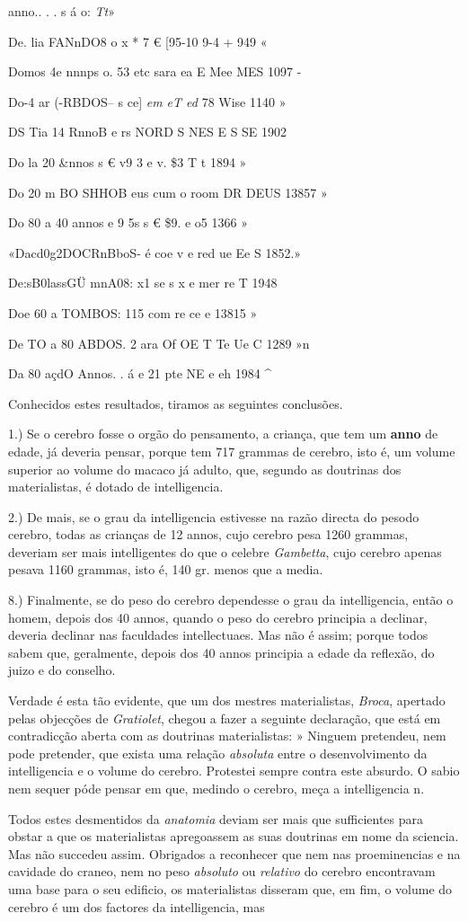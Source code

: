 anno.. . . s á o: \emph{Tt}»\par De. lia FANnDO8 o x * 7 € [95-10 9-4 + 949 «\par Domos 4e nnnps o. 53 etc sara ea E Mee MES 1097 -\par Do-4 ar (-RBDOS-- s ce] \emph{em eT ed} 78 Wise 1140 »\par DS Tia 14 RnnoB e rs NORD S NES E S SE 1902\par Do la 20 \&nnos s € v9 3 e v. \$3 T t 1894 »\par Do 20 m BO SHHOB eus cum o room DR DEUS 13857 »\par Do 80 a 40 annos e 9 5s s € \$9. e o5 1366 »\par «Dacd0g2DOCRnBboS- é coe v e red ue Ee S 1852.»\par De:sB0lassGÜ mnA08: x1 se s x e mer re T 1948\par Doe 60 a TOMBOS: 115 com re ce e 13815 »\par De TO a 80 ABDOS. 2 ara Of OE T Te Ue C 1289 »n\par Da 80 açdO Annos. . á e 21 pte NE e eh 1984 \textasciicircum{}\par Conhecidos estes resultados, tiramos as seguintes conclusões.\par 1.) Se o cerebro fosse o orgão do pensamento, a criança, que tem um \textbf{anno} de edade, já deveria pensar, porque tem 717 grammas de cerebro, isto é, um volume superior ao volume do macaco já adulto, que, segundo as doutrinas dos materialistas, é dotado de intelligencia.\par 2.) De mais, se o grau da intelligencia estivesse na razão directa do pesodo cerebro, todas as crianças de 12 annos, cujo cerebro pesa 1260 grammas, deveriam ser mais intelligentes do que o celebre \emph{Gambetta}, cujo cerebro apenas pesava 1160 grammas, isto é, 140 gr. menos que a media.\par 8.) Finalmente, se do peso do cerebro dependesse o grau da intelligencia, então o homem, depois dos 40 annos, quando o peso do cerebro principia a declinar, deveria declinar nas faculdades intellectuaes. Mas não é assim; porque todos sabem que, geralmente, depois dos 40 annos principia a edade da reflexão, do juizo e do conselho.\par Verdade é esta tão evidente, que um dos mestres materialistas, \emph{Broca}, apertado pelas objecções de \emph{Gratiolet}, chegou a fazer a seguinte declaração, que está em contradicção aberta com as doutrinas materialistas: » Ninguem pretendeu, nem pode pretender, que exista uma relação \emph{absoluta} entre o desenvolvimento da intelligencia e o volume do cerebro. Protestei sempre contra este absurdo. O sabio nem sequer póde pensar em que, medindo o cerebro, meça a intelligencia n.\par Todos estes desmentidos da \emph{anatomia} deviam ser mais que sufficientes para obstar a que os materialistas apregoassem as suas doutrinas em nome da sciencia. Mas não succedeu assim. Obrigados a reconhecer que nem nas proeminencias e na cavidade do craneo, nem no peso \emph{absoluto} ou \emph{relativo} do cerebro encontravam uma base para o seu edificio, os materialistas disseram que, em fim, o volume do cerebro é um dos factores da intelligencia, mas 